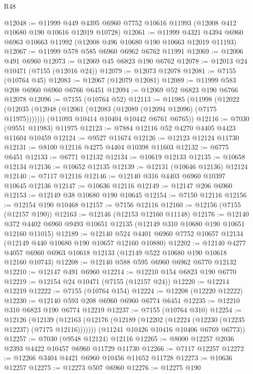 \begin{lexlean}{R48}
\begin{coremodule}
@12048 := @11999 @449 @4395 @6960 @7752 @10616 @11993 (@12008 @412 @10680 @190 @10616 @12019 @10728)
@12061 := @11999
    @4321
    @4394
    @6960
    @6963
    @10663
    @11992
    (@12008 @496 @10680 @190 @10663 @12019 @11193)
@12067 := @11999 @578 @585 @6960 @6962 @6762 @11991
@12069 := @12006 @491 @6960
@12073 := @12069 @45 @6823 @190 @6762
@12078 := @12013 @24 @10471 (@7155 (@12016 @24))
@12079 := @12073 @12078
@12081 := @7155 (@10764 @45)
@12083 := @12067 (@12079 @12081)
@12089 := @11999 @583 @208 @6960 @6960 @6766 @6451
@12094 := @12069 @52 @6823 @190 @6766 @12078
@12096 := @7155 (@10764 @52)
@12113 := @11985
    (@11998
      (@12022 (@12035 (@12048 (@12061 (@12083 (@12089 (@12094 @12096) (@7175 @11975)))))))
      (@11093 @10414 @10404 @10442 @6761 @6765))
@12116 := @7030 (@9551 @11983) @11975
@12123 := @7884 @12116 @52 @4270 @4405 @4423 @11604 @10459
@12124 := @9527 @11674
@12126 := @12123 @12124 @11730
@12131 := @8100 @12116 @4275 @4404 @10398 @11603
@12132 := @6775 @6451
@12133 := @6771 @12132
@12134 := @10619 @12133
@12135 := @10658 @12134
@12136 := @10652 @12135
@12139 := @12131 (@10646 @12136) @12124
@12140 := @7117 @12116
@12146 := @12140 @316 @4403 @6960 @10397 @10645 @12136
@12147 := @10636 @12116
@12149 := @12147 @206 @6960
@12153 := @12149 @38 @10680 @190 @10645
@12154 := @7150 @12116
@12156 := @12154 @190 @10468
@12157 := @7156 @12116
@12160 := @12156 (@7155 (@12157 @190))
@12163 := @12146 (@12153 @12160 @11148)
@12176 := @12140 @372 @4402 @6960 @9493 @10651 @12135 (@12149 @310 @10680 @190 @10651 @12160 @11015)
@12189 := @12140 @524 @4401 @6960 @7752 @10657 @12134 (@12149 @440 @10680 @190 @10657 @12160 @10880)
@12202 := @12140
    @4277
    @4057
    @6960
    @6963
    @10618
    @12133
    (@12149 @522 @10680 @190 @10618 @12160 @10743)
@12208 := @12140 @588 @595 @6960 @6962 @6770 @12132
@12210 := @12147 @491 @6960
@12214 := @12210 @154 @6823 @190 @6770
@12219 := @12154 @24 @10471 (@7155 (@12157 @24))
@12220 := @12214 @12219
@12222 := @7155 (@10764 @154)
@12224 := @12208 (@12220 @12222)
@12230 := @12140 @593 @208 @6960 @6960 @6774 @6451
@12235 := @12210 @310 @6823 @190 @6774 @12219
@12237 := @7155 (@10764 @310)
@12254 := @12126
    (@12139
      (@12163 (@12176 (@12189 (@12202 (@12224 (@12230 (@12235 @12237) (@7175 @12116)))))))
      (@11241 @10426 @10416 @10406 @6769 @6773))
@12257 := @7030 (@9548 @12124) @12116
@12265 := @8000 @12257 @2036 @2393 @4422 @10457 @6960 @11729 @11730
@12266 := @7117 @12257
@12272 := @12266 @3404 @4421 @6960 @10456 @11652 @11728
@12273 := @10636 @12257
@12275 := @12273 @507 @6960
@12276 := @12275 @190

\end{coremodule}
\end{lexlean}
